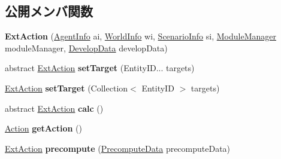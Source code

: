 \subsection*{公開メンバ関数}
\begin{DoxyCompactItemize}
\item 
\hypertarget{classadf_1_1component_1_1extaction_1_1ExtAction_a24f45e55bf8015b446ce66c62f2c3e04}{}\label{classadf_1_1component_1_1extaction_1_1ExtAction_a24f45e55bf8015b446ce66c62f2c3e04} 
{\bfseries Ext\+Action} (\hyperlink{classadf_1_1agent_1_1info_1_1AgentInfo}{Agent\+Info} ai, \hyperlink{classadf_1_1agent_1_1info_1_1WorldInfo}{World\+Info} wi, \hyperlink{classadf_1_1agent_1_1info_1_1ScenarioInfo}{Scenario\+Info} si, \hyperlink{classadf_1_1agent_1_1module_1_1ModuleManager}{Module\+Manager} module\+Manager, \hyperlink{classadf_1_1agent_1_1develop_1_1DevelopData}{Develop\+Data} develop\+Data)
\item 
\hypertarget{classadf_1_1component_1_1extaction_1_1ExtAction_a77ec92e848e5ac3daa7b4680c9860b9a}{}\label{classadf_1_1component_1_1extaction_1_1ExtAction_a77ec92e848e5ac3daa7b4680c9860b9a} 
abstract \hyperlink{classadf_1_1component_1_1extaction_1_1ExtAction}{Ext\+Action} {\bfseries set\+Target} (Entity\+I\+D... targets)
\item 
\hypertarget{classadf_1_1component_1_1extaction_1_1ExtAction_ae47347614030259c60100eef0862c523}{}\label{classadf_1_1component_1_1extaction_1_1ExtAction_ae47347614030259c60100eef0862c523} 
\hyperlink{classadf_1_1component_1_1extaction_1_1ExtAction}{Ext\+Action} {\bfseries set\+Target} (Collection$<$ Entity\+ID $>$ targets)
\item 
\hypertarget{classadf_1_1component_1_1extaction_1_1ExtAction_aa059b85523f542e5c78b9eae00351cca}{}\label{classadf_1_1component_1_1extaction_1_1ExtAction_aa059b85523f542e5c78b9eae00351cca} 
abstract \hyperlink{classadf_1_1component_1_1extaction_1_1ExtAction}{Ext\+Action} {\bfseries calc} ()
\item 
\hypertarget{classadf_1_1component_1_1extaction_1_1ExtAction_aaeeadcb73477a938f9461bfd123f8193}{}\label{classadf_1_1component_1_1extaction_1_1ExtAction_aaeeadcb73477a938f9461bfd123f8193} 
\hyperlink{classadf_1_1agent_1_1action_1_1Action}{Action} {\bfseries get\+Action} ()
\item 
\hypertarget{classadf_1_1component_1_1extaction_1_1ExtAction_ad19b84314c27fe9c957481be4ab8d3fb}{}\label{classadf_1_1component_1_1extaction_1_1ExtAction_ad19b84314c27fe9c957481be4ab8d3fb} 
\hyperlink{classadf_1_1component_1_1extaction_1_1ExtAction}{Ext\+Action} {\bfseries precompute} (\hyperlink{classadf_1_1agent_1_1precompute_1_1PrecomputeData}{Precompute\+Data} precompute\+Data)

\end{DoxyCompactItemize}

